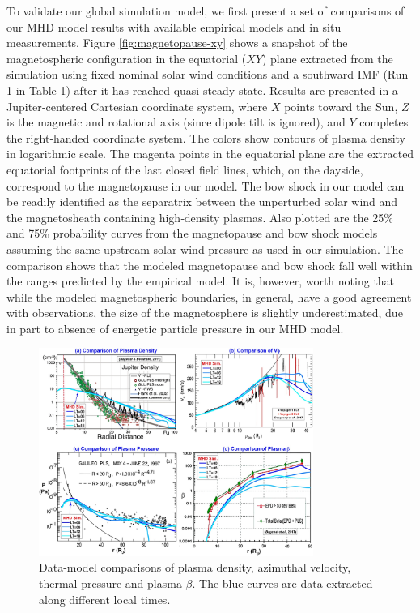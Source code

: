 To validate our global simulation model, we first present a set of comparisons of our MHD model results with available empirical models and in situ measurements. Figure \ref{fig:magnetopause-xy} shows a snapshot of the magnetospheric configuration in the equatorial ($XY$) plane extracted from the simulation using fixed nominal solar wind conditions and a southward IMF (Run 1 in Table 1) after it has reached quasi‐steady state. Results are presented in a Jupiter‐centered Cartesian coordinate system, where $X$ points toward the Sun, $Z$ is the magnetic and rotational axis (since dipole tilt is ignored), and $Y$ completes the right‐handed coordinate system. The colors show contours of plasma density in logarithmic scale. The magenta points in the equatorial plane are the extracted equatorial footprints of the last closed field lines, which, on the dayside, correspond to the magnetopause in our model. The bow shock in our model can be readily identified as the separatrix between the unperturbed solar wind and the magnetosheath containing high‐density plasmas. Also plotted are the 25\% and 75\% probability curves from the \cite{Joy2002a} magnetopause and bow shock models assuming the same upstream solar wind pressure as used in our simulation. The comparison shows that the modeled magnetopause and bow shock fall well within the ranges predicted by the  empirical model. It is, however, worth noting that while the modeled magnetospheric boundaries, in general, have a good agreement with observations, the size of the magnetosphere is slightly underestimated, due in part to absence of energetic particle pressure in our MHD model. 

\begin{figure}
    \centering
    \includegraphics[width=0.8\textwidth]{images2/comparison-plasma.jpg}
    \caption{Data-model comparisons of plasma density, azimuthal velocity, thermal pressure and plasma $\beta$. The blue curves are data extracted along different local times.}
    \label{fig:comparison-plasma}
\end{figure}

